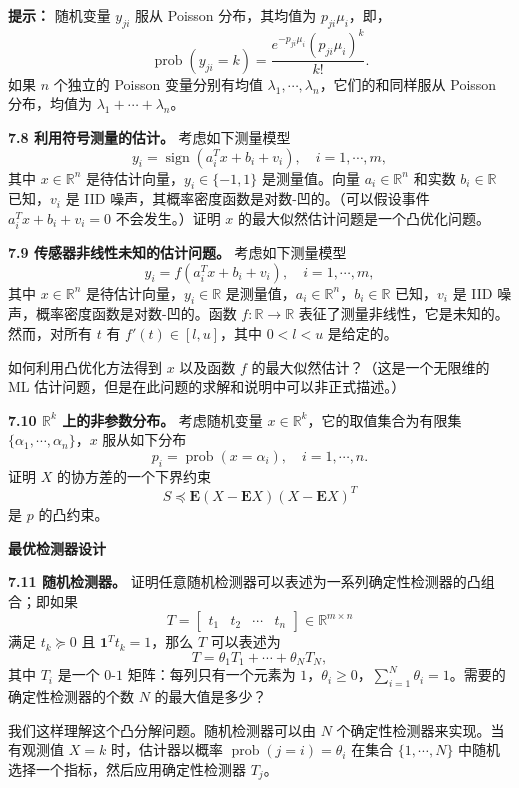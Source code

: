 \documentclass[UTF8,12pt,a4paper,fontset=fandol]{ctexart}
\begin{document}
\noindent\textbf{提示：}\quad
随机变量 $y_{ji}$ 服从 Poisson 分布，其均值为 $p_{ji}\mu_i$，即，
\[
\operatorname{prob}(y_{ji}=k)=\frac{e^{-p_{ji}\mu_i}(p_{ji}\mu_i)^k}{k!}.
\]
如果 $n$ 个独立的 Poisson 变量分别有均值 $\lambda_1,\cdots,\lambda_n$，它们的和同样服从 Poisson 分布，均值为 $\lambda_1+\cdots+\lambda_n$。

\noindent\textbf{7.8 利用符号测量的估计。}\quad
考虑如下测量模型
\[
y_i=\operatorname{sign}(a_i^Tx+b_i+v_i),\quad i=1,\cdots,m,
\]
其中 $x\in\mathbb{R}^n$ 是待估计向量，$y_i\in\{-1,1\}$ 是测量值。向量 $a_i\in\mathbb{R}^n$ 和实数 $b_i\in\mathbb{R}$ 已知，$v_i$ 是 IID 噪声，其概率密度函数是对数-凹的。（可以假设事件 $a_i^Tx+b_i+v_i=0$ 不会发生。）证明 $x$ 的最大似然估计问题是一个凸优化问题。

\noindent\textbf{7.9 传感器非线性未知的估计问题。}\quad
考虑如下测量模型
\[
y_i=f(a_i^Tx+b_i+v_i),\quad i=1,\cdots,m,
\]
其中 $x\in\mathbb{R}^n$ 是待估计向量，$y_i\in\mathbb{R}$ 是测量值，$a_i\in\mathbb{R}^n$，$b_i\in\mathbb{R}$ 已知，$v_i$ 是 IID 噪声，概率密度函数是对数-凹的。函数 $f:\mathbb{R}\to\mathbb{R}$ 表征了测量非线性，它是未知的。然而，对所有 $t$ 有 $f'(t)\in[l,u]$，其中 $0<l<u$ 是给定的。

如何利用凸优化方法得到 $x$ 以及函数 $f$ 的最大似然估计？（这是一个无限维的 ML 估计问题，但是在此问题的求解和说明中可以非正式描述。）

\noindent\textbf{7.10 $\mathbb{R}^k$ 上的非参数分布。}\quad
考虑随机变量 $x\in\mathbb{R}^k$，它的取值集合为有限集 $\{\alpha_1,\cdots,\alpha_n\}$，$x$ 服从如下分布
\[
p_i=\operatorname{prob}(x=\alpha_i),\quad i=1,\cdots,n.
\]
证明 $X$ 的协方差的一个下界约束
\[
S\preceq \mathbf{E}(X-\mathbf{E}X)(X-\mathbf{E}X)^T
\]
是 $p$ 的凸约束。

\noindent\textbf{最优检测器设计}

\noindent\textbf{7.11 随机检测器。}\quad
证明任意随机检测器可以表述为一系列确定性检测器的凸组合；即如果
\[
T=\begin{bmatrix}t_1&t_2&\cdots&t_n\end{bmatrix}\in\mathbb{R}^{m\times n}
\]
满足 $t_k\succeq 0$ 且 $\mathbf{1}^Tt_k=1$，那么 $T$ 可以表述为
\[
T=\theta_1T_1+\cdots+\theta_NT_N,
\]
其中 $T_i$ 是一个 $0$-$1$ 矩阵：每列只有一个元素为 $1$，$\theta_i\geq 0$，$\sum_{i=1}^N\theta_i=1$。需要的确定性检测器的个数 $N$ 的最大值是多少？

我们这样理解这个凸分解问题。随机检测器可以由 $N$ 个确定性检测器来实现。当有观测值 $X=k$ 时，估计器以概率 $\operatorname{prob}(j=i)=\theta_i$ 在集合 $\{1,\cdots,N\}$ 中随机选择一个指标，然后应用确定性检测器 $T_j$。
\end{document}
